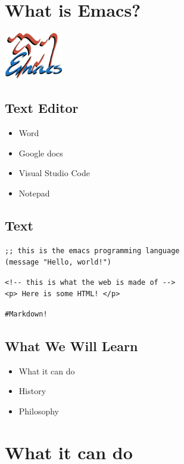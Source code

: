 \documentclass[11pt]{article}
\author{David Lewis}
\date{\today}
\title{}
\begin{document}
\section*{What is Emacs?}
\label{sec:orgfb2808c}
\begin{center}
\includegraphics[width=1in]{emacs.png}
\end{center}
\subsection*{Text Editor}
\label{sec:org9e2a255}
\begin{itemize}
\item Word
\item Google docs
\item Visual Studio Code
\item Notepad
\end{itemize}
\subsection*{Text}
\label{sec:org6b3234c}
\begin{verbatim}
;; this is the emacs programming language
(message "Hello, world!")
\end{verbatim}


\begin{verbatim}
<!-- this is what the web is made of -->
<p> Here is some HTML! </p>
\end{verbatim}


\begin{verbatim}
#Markdown!
\end{verbatim}
\subsection*{What We Will Learn}
\label{sec:org6dcdaf3}
\begin{itemize}
\item What it can do
\item History
\item Philosophy
\end{itemize}
\section*{What it can do}
\label{sec:orgc09a727}
\end{document}
